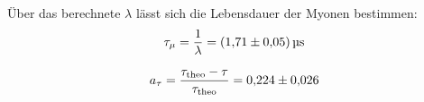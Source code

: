 Über das berechnete $\lambda$ lässt sich die Lebensdauer der Myonen bestimmen:
\begin{equation*}
    \tau_{\mu} = \frac{1}{\lambda} = \SI{1.71+-0.05}{\micro\second}
\end{equation*}

\begin{equation*}
    a_{\tau} = \frac{\tau_{\text{theo}} - \tau}{\tau_{\text{theo}}} = \num{0.224 +- 0.026}
\end{equation*}